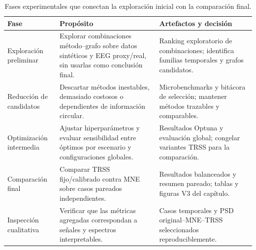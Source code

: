 \begin{table}[H]
\centering
\footnotesize
\setlength{\tabcolsep}{3pt}
\caption{Fases experimentales que conectan la exploración inicial con la comparación final.}
\label{tab:ch4_experimental_phase_overview}
\begin{tabular}{@{}p{2.8cm}p{4.1cm}p{4.6cm}@{}}
\toprule
Fase & Propósito & Artefactos y decisión \\
\midrule
Exploración preliminar & Explorar combinaciones método--grafo sobre datos sintéticos y EEG proxy/real, sin usarlas como conclusión final. & Ranking exploratorio de combinaciones; identifica familias temporales y grafos candidatos. \\
Reducción de candidatos & Descartar métodos inestables, demasiado costosos o dependientes de información circular. & Microbenchmarks y bitácora de selección; mantener métodos trazables y comparables. \\
Optimización intermedia & Ajustar hiperparámetros y evaluar sensibilidad entre óptimos por escenario y configuraciones globales. & Resultados Optuna y evaluación global; congelar variantes TRSS para la comparación. \\
Comparación final & Comparar TRSS fijo/calibrado contra MNE sobre casos pareados independientes. & Resultados balanceados y resumen pareado; tablas y figuras V3 del capítulo. \\
Inspección cualitativa & Verificar que las métricas agregadas correspondan a señales y espectros interpretables. & Casos temporales y PSD original--MNE--TRSS seleccionados reproduciblemente. \\
\bottomrule
\end{tabular}
\end{table}
